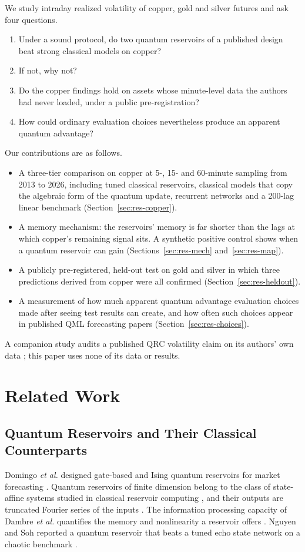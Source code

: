 \documentclass{ieeeaccess}
\begin{document}
We study intraday realized volatility of copper, gold and silver futures and ask four questions.
\begin{enumerate}
\item Under a sound protocol, do two quantum reservoirs of a published design \cite{domingo2026} beat strong classical models on copper?
\item If not, why not?
\item Do the copper findings hold on assets whose minute-level data the authors had never loaded, under a public pre-registration?
\item How could ordinary evaluation choices nevertheless produce an apparent quantum advantage?
\end{enumerate}

Our contributions are as follows.
\begin{itemize}
\item A three-tier comparison on copper at 5-, 15- and 60-minute sampling from 2013 to 2026, including tuned classical reservoirs, classical models that copy the algebraic form of the quantum update, recurrent networks and a 200-lag linear benchmark (Section~\ref{sec:res-copper}).
\item A memory mechanism: the reservoirs' memory is far shorter than the lags at which copper's remaining signal sits. A synthetic positive control shows when a quantum reservoir can gain (Sections~\ref{sec:res-mech} and~\ref{sec:res-map}).
\item A publicly pre-registered, held-out test on gold and silver in which three predictions derived from copper were all confirmed (Section~\ref{sec:res-heldout}).
\item A measurement of how much apparent quantum advantage evaluation choices made after seeing test results can create, and how often such choices appear in published QML forecasting papers (Section~\ref{sec:res-choices}).
\end{itemize}
A companion study audits a published QRC volatility claim on its authors' own data \cite{companion}; this paper uses none of its data or results.

\section{Related Work}
\label{sec:related}

\subsection{Quantum Reservoirs and Their Classical Counterparts}
Domingo \emph{et al.} designed gate-based and Ising quantum reservoirs for market forecasting \cite{domingo2026}. Quantum reservoirs of finite dimension belong to the class of state-affine systems studied in classical reservoir computing \cite{martinezpena2023}, and their outputs are truncated Fourier series of the inputs \cite{schutte2025}. The information processing capacity of Dambre \emph{et al.} quantifies the memory and nonlinearity a reservoir offers \cite{dambre2012}. Nguyen and Soh reported a quantum reservoir that beats a tuned echo state network on a chaotic benchmark \cite{nguyen2026}.
\end{document}
